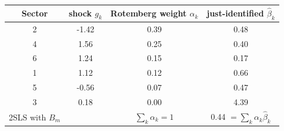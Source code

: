 \begin{tabular}{cccc}\toprule
Sector & shock $g_k$ & Rotemberg weight $\alpha_k$ & just-identified $\hat\beta_k$ \\ \midrule
2 & -1.42 & 0.39 & 0.48 \\
4 & 1.56 & 0.25 & 0.40 \\
6 & 1.24 & 0.15 & 0.17 \\
1 & 1.12 & 0.12 & 0.66 \\
5 & -0.56 & 0.07 & 0.47 \\
3 & 0.18 & 0.00 & 4.39 \\
\midrule 2SLS with $B_m$ & & $\sum_k \alpha_k = 1$ & 0.44 $= \sum_k \alpha_k \hat\beta_k$ \\
\bottomrule\end{tabular}
